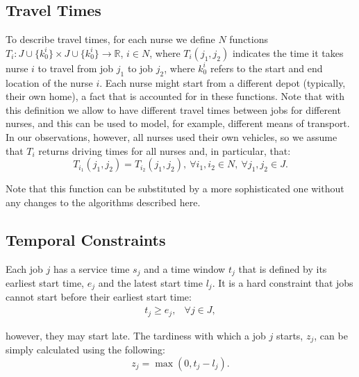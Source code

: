 \documentclass[a4paper,11pt,authoryear]{elsarticle}
\begin{document}
\subsection{Travel Times}
\label{sub:traveltimes}
\noindent To describe travel times, for each nurse we define $N$ functions $T_i: J\cup\{k^i_0\} \times J\cup\{k^i_0\} \rightarrow \mathbb{R}$, $i \in N$, where $T_i(j_1, j_2)$ indicates the time it takes nurse $i$ to travel from job $j_1$ to job $j_2$, where $k^i_0$ refers to the start and end location of the nurse $i$. Each nurse might start from a different depot (typically, their own home), a fact that is accounted for in these functions. Note that with this definition we allow to have different travel times between jobs for different nurses, and this can be used to model, for example, different means of transport. In our observations, however, all nurses used their own vehicles, so we assume that $T_i$ returns driving times for all nurses and, in particular, that:
\begin{equation}
    T_{i_1}(j_1, j_2) = T_{i_2}(j_1, j_2),\ \forall i_1, i_2 \in N,\ \forall j_1, j_2 \in J. \label{eqn:traveltimequality}
\end{equation} 

\noindent Note that this function can be substituted by a more sophisticated one without any changes to the algorithms described here.


\subsection{Temporal Constraints}
\label{sub:temporalconstraints}
\noindent Each job $j$ has a service time $s_j$ and a time window $t_j$ that is defined by its earliest start time, $e_j$ and the latest start time $l_j$. It is a hard constraint that jobs cannot start before their earliest start time:
\begin{align}
    t_j \geq e_j, & \forall j \in J, \label{eqn:jobstart}
\end{align}

\noindent however, they may start late. The tardiness with which a job $j$ starts, $z_j$, can be simply calculated using the following:
\begin{equation}
    z_j = \max(0, t_j - l_j). \label{eqn:tardiness}
\end{equation}
\end{document}
